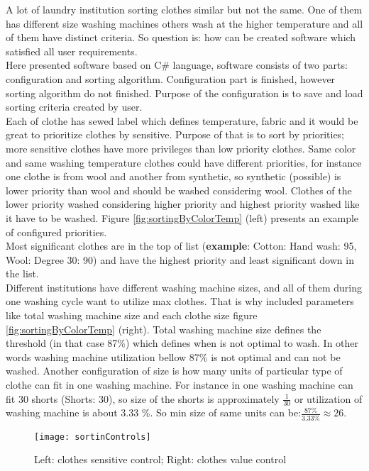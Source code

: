 A lot of laundry institution sorting clothes similar but not the same. One of them has different size washing machines others wash at the higher temperature and all of them have distinct criteria.   So question is: how can be created software which satisfied all user requirements. \\  Here presented software based on C\# language, software consists of two parts: configuration and sorting algorithm. Configuration part is finished, however sorting algorithm do not finished. Purpose of the configuration is to save and load sorting criteria created by user. 
\\
Each of clothe has sewed label which defines temperature, fabric and it would be great to prioritize clothes by sensitive. Purpose of that is to sort by priorities; more sensitive clothes have more privileges than low priority clothes. Same color and same washing temperature clothes could have different priorities, for instance one clothe is from wool and another from synthetic, so synthetic (possible) is lower priority than wool and should be washed considering wool. Clothes of the lower priority washed considering higher priority and highest priority washed like it have to be washed. Figure \ref{fig:sortingByColorTemp} (left) presents an example of configured priorities. \\ Most significant clothes are in the top of list (\textbf{example}: Cotton: Hand wash: 95, Wool: Degree 30: 90) and have the highest priority and least significant down in the list. 
\\
Different institutions have different washing machine sizes, and all of them during one washing cycle want to utilize max clothes. That is why included parameters like total washing machine size and each clothe size figure \ref{fig:sortingByColorTemp} (right). Total washing machine size defines the threshold (in that case 87\%) which defines when is not optimal to wash. In other words washing machine utilization bellow 87\% is not optimal and can not be washed. Another configuration of size is how many units of particular type of clothe can fit in one washing machine. For instance in one washing machine can fit 30 shorts (Shorts: 30), so size of the shorts is approximately $\frac{1}{30}$ or utilization of washing machine is about 3.33 \%. So min size of same units can be:$\frac{87\%}{3.33\%}\approx 26$. \\

\begin{figure}[h]
	\centering
		\texttt{[image: sortinControls]}
	\caption{Left: clothes sensitive control; Right: clothes value control}
	\label{fig:sortinControls}
\end{figure}


